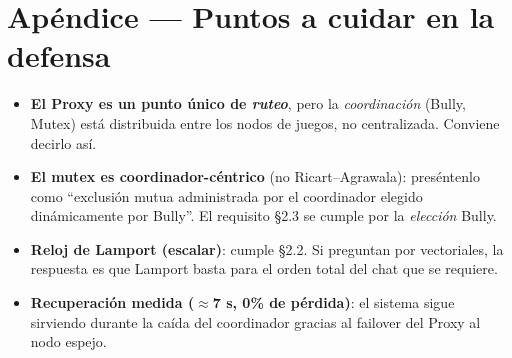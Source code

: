 \documentclass[11pt,a4paper]{article}
\begin{document}
\section{Apéndice — Puntos a cuidar en la defensa}

\begin{itemize}[leftmargin=1.4em]
  \item \textbf{El Proxy es un punto único de \emph{ruteo}}, pero la \emph{coordinación} (Bully,
        Mutex) está distribuida entre los nodos de juegos, no centralizada. Conviene decirlo así.
  \item \textbf{El mutex es coordinador-céntrico} (no Ricart--Agrawala): preséntenlo como
        ``exclusión mutua administrada por el coordinador elegido dinámicamente por Bully''.
        El requisito §2.3 se cumple por la \emph{elección} Bully.
  \item \textbf{Reloj de Lamport (escalar)}: cumple §2.2. Si preguntan por vectoriales, la
        respuesta es que Lamport basta para el orden total del chat que se requiere.
  \item \textbf{Recuperación medida ($\approx$7 s, 0\% de pérdida)}: el sistema sigue
        sirviendo durante la caída del coordinador gracias al failover del Proxy al nodo espejo.
\end{itemize}
\end{document}
